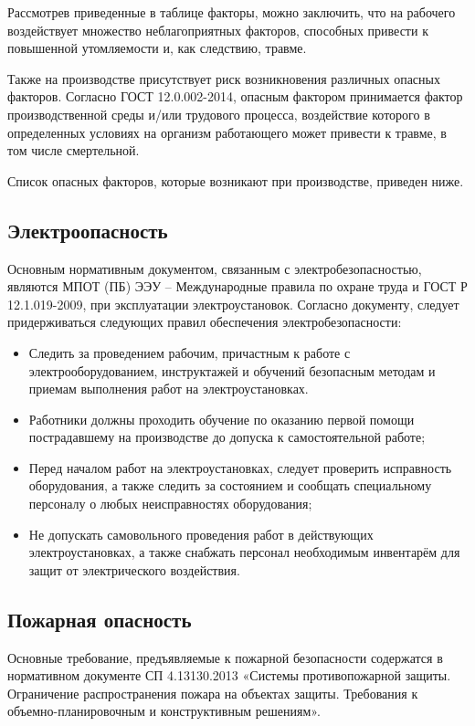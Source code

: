 Рассмотрев приведенные в таблице факторы, можно заключить, что на рабочего воздействует множество неблагоприятных факторов, способных привести к повышенной утомляемости и, как следствию, травме.

Также на производстве присутствует риск возникновения различных опасных факторов. Согласно ГОСТ 12.0.002-2014, опасным фактором принимается фактор производственной среды и/или трудового процесса, воздействие которого в определенных условиях на организм работающего может привести к травме, в том числе смертельной.

Список опасных факторов, которые возникают при производстве, приведен ниже.

\subsection{Электроопасность}
Основным нормативным документом, связанным с электробезопасностью, являются МПОТ (ПБ) ЭЭУ – Международные правила по охране труда и ГОСТ Р 12.1.019-2009, при эксплуатации электроустановок.
Согласно документу, следует придерживаться следующих правил обеспечения электробезопасности:
\begin{itemize}
	\item Следить за проведением рабочим, причастным к работе с электрооборудованием, инструктажей и обучений безопасным методам и приемам выполнения работ на электроустановках.
	\item Работники должны проходить обучение по оказанию первой помощи пострадавшему на производстве до допуска к самостоятельной работе;
	\item Перед началом работ на электроустановках, следует проверить исправность оборудования, а также следить за состоянием и сообщать специальному персоналу о любых неисправностях оборудования;
	\item Не допускать самовольного проведения работ в действующих электроустановках, а также снабжать персонал необходимым инвентарём для защит от электрического воздействия. 
\end{itemize}

\subsection{Пожарная опасность}
Основные требование, предъявляемые к пожарной безопасности содержатся в нормативном документе СП 4.13130.2013 «Системы противопожарной защиты. Ограничение распространения пожара на объектах защиты. Требования к объемно-планировочным и конструктивным решениям».

